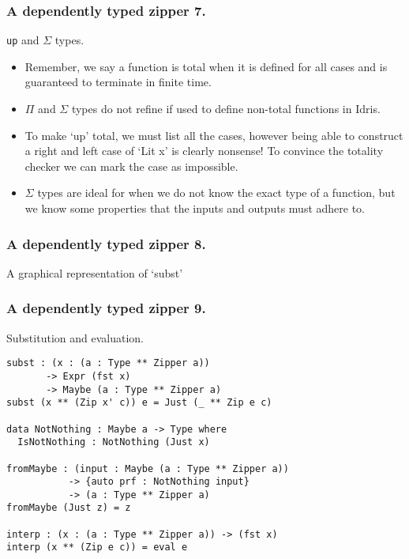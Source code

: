 \documentclass{beamer}
\begin{document}
\begin{frame}[fragile]
  \frametitle{A dependently typed zipper 7.}
  \begin{block}{\texttt{up} and $\Sigma$ types.}
    \begin{itemize}
      \item Remember, we say a function is total when it is defined
        for all cases and is guaranteed to terminate in finite time.
      \item $\Pi$ and $\Sigma$ types do not refine if used to define
        non-total functions in Idris.
      \item To make `up' total, we must list all the cases, however
        being able to construct a right and left case of `Lit x' is
        clearly nonsense! To convince the totality checker we can
        mark the case as impossible.
     \item $\Sigma$ types are ideal for when we do not know the 
       exact type of a function, but we know some properties that
       the inputs and outputs must adhere to.
    \end{itemize}
  \end{block}
\end{frame}

\begin{frame}[fragile]
  \frametitle{A dependently typed zipper 8.}
  \begin{block}{A graphical representation of `subst'}
  \end{block}
\end{frame}

\begin{frame}[fragile]
  \frametitle{A dependently typed zipper 9.}
  \begin{block}{Substitution and evaluation.}
  \begin{verbatim}
subst : (x : (a : Type ** Zipper a)) 
       -> Expr (fst x) 
       -> Maybe (a : Type ** Zipper a)
subst (x ** (Zip x' c)) e = Just (_ ** Zip e c)

data NotNothing : Maybe a -> Type where
  IsNotNothing : NotNothing (Just x)

fromMaybe : (input : Maybe (a : Type ** Zipper a))
           -> {auto prf : NotNothing input}
           -> (a : Type ** Zipper a)
fromMaybe (Just z) = z

interp : (x : (a : Type ** Zipper a)) -> (fst x)
interp (x ** (Zip e c)) = eval e
  \end{verbatim}
  \end{block}
\end{frame}
\end{document}
